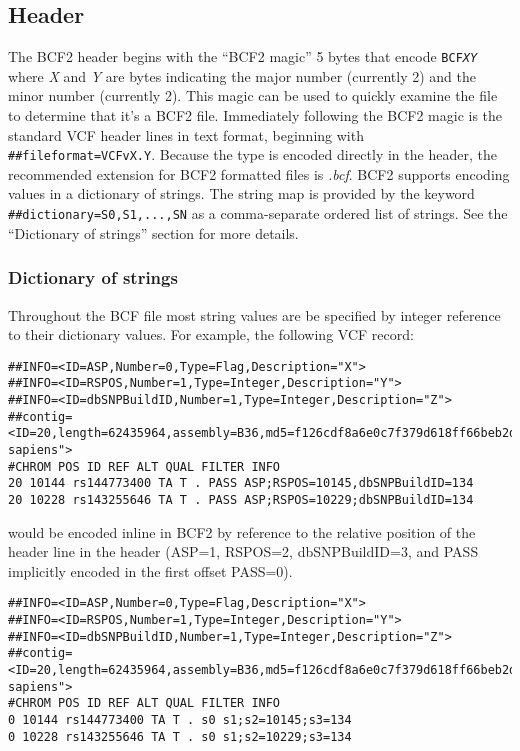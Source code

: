 \documentclass[8pt]{article}
\begin{document}
\subsection{Header}

The BCF2 header begins with the ``BCF2 magic'' 5 bytes that encode {\tt BCF\em XY} where {\em X} and {\em Y} are bytes indicating the major number (currently 2) and the minor number (currently 2).
This magic can be used to quickly examine the file to determine that it's a BCF2 file.
Immediately following the BCF2 magic is the standard VCF header lines in text format, beginning with \verb|##fileformat=VCFvX.Y|.
Because the type is encoded directly in the header, the recommended extension for BCF2 formatted files is {\sl .bcf}.
BCF2 supports encoding values in a dictionary of strings.
The string map is provided by the keyword \verb|##dictionary=S0,S1,...,SN| as a comma-separate ordered list of strings.
See the ``Dictionary of strings'' section for more details.

\subsubsection{Dictionary of strings}

Throughout the BCF file most string values are be specified by integer reference to their dictionary values.
For example, the following VCF record:
\small
\begin{verbatim}
##INFO=<ID=ASP,Number=0,Type=Flag,Description="X">
##INFO=<ID=RSPOS,Number=1,Type=Integer,Description="Y">
##INFO=<ID=dbSNPBuildID,Number=1,Type=Integer,Description="Z">
##contig=<ID=20,length=62435964,assembly=B36,md5=f126cdf8a6e0c7f379d618ff66beb2da,species="Homo sapiens">
#CHROM POS ID REF ALT QUAL FILTER INFO
20 10144 rs144773400 TA T . PASS ASP;RSPOS=10145,dbSNPBuildID=134
20 10228 rs143255646 TA T . PASS ASP;RSPOS=10229;dbSNPBuildID=134
\end{verbatim}
\normalsize
would be encoded inline in BCF2 by reference to the relative position of the header line in the header (ASP=1, RSPOS=2, dbSNPBuildID=3, and PASS implicitly encoded in the first offset PASS=0).

\small
\begin{verbatim}
##INFO=<ID=ASP,Number=0,Type=Flag,Description="X">
##INFO=<ID=RSPOS,Number=1,Type=Integer,Description="Y">
##INFO=<ID=dbSNPBuildID,Number=1,Type=Integer,Description="Z">
##contig=<ID=20,length=62435964,assembly=B36,md5=f126cdf8a6e0c7f379d618ff66beb2da,species="Homo sapiens">
#CHROM POS ID REF ALT QUAL FILTER INFO
0 10144 rs144773400 TA T . s0 s1;s2=10145;s3=134
0 10228 rs143255646 TA T . s0 s1;s2=10229;s3=134
\end{verbatim}
\normalsize
\end{document}
